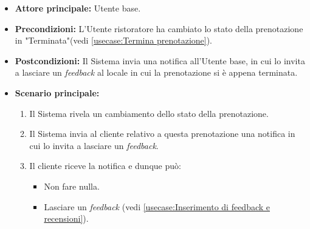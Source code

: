 \label{usecase:Notifica di inserimento di un feedback}
\begin{itemize}
	\item \textbf{Attore principale:} Utente base.

	
	\item \textbf{Precondizioni:} L'Utente ristoratore ha cambiato lo stato della prenotazione in "Terminata"(vedi \autoref{usecase:Termina prenotazione}).

    
	\item \textbf{Postcondizioni:} Il Sistema invia una notifica all'Utente base, in cui lo invita a lasciare un \textit{feedback} al locale in cui la prenotazione si è appena terminata.
     
	\item \textbf{Scenario principale:}
	      \begin{enumerate}
                \item Il Sistema rivela un cambiamento dello stato della prenotazione.
                \item Il Sistema invia al cliente relativo a questa prenotazione una notifica in cui lo invita a lasciare un \textit{feedback}.
                \item Il cliente riceve la notifica e dunque può:
                \begin{itemize}
                    \item Non fare nulla.
                    \item Lasciare un \textit{feedback} (vedi \autoref{usecase:Inserimento di feedback e recensioni}).
                \end{itemize}
	      \end{enumerate}
\end{itemize}